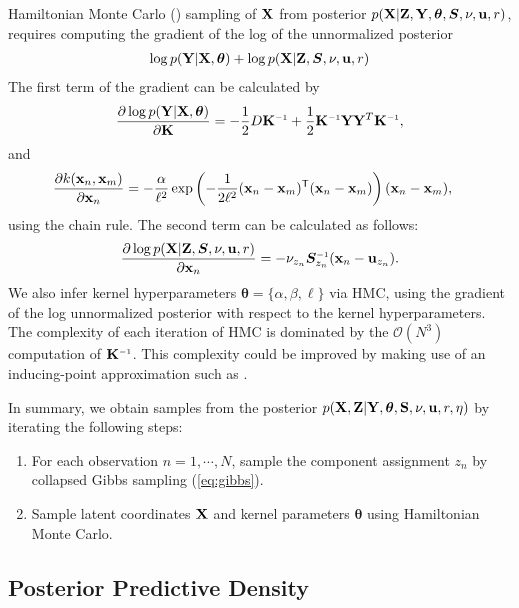 Hamiltonian Monte Carlo (\HMC{}) sampling of $\mathbf{X}$ from posterior ${p(\mathbf{X}|\mathbf{Z},\mathbf{Y},\bm{\theta},\bm{S},\nu,{\bf{u}},r)}$, requires computing the gradient of the log of the unnormalized posterior
%
\begin{align}
\log p(\mathbf{Y}|\mathbf{X},\bm{\theta}) + \log p(\mathbf{X}|\mathbf{Z},\bm{S},\nu,{\bf{u}},r)
\end{align}
%
The first term of the gradient can be calculated by
%
\begin{align}
\pderiv{\log p(\vY | \vX,\bm{\theta})}{\vK} = -\frac{1}{2}D\vK\inv+\frac{1}{2}\vK\inv \vY \vY^{T} \vK\inv, 
\end{align}
%
and
%
\begin{align}
\frac{\partial k({\bf{x}}_{n},{\bf{x}}_{m})}{\partial {\bf{x}}_n}
 & = -\frac{\alpha}{\ell^2} \exp \left( - \frac{1}{2 \ell^2} ({\bf{x}}_n - {\bf{x}}_m)^{\mathsf{T}} ({\bf{x}}_n - {\bf{x}}_m) \right) ({\bf{x}}_n - {\bf{x}}_m),
\end{align}
%
using the chain rule.
The second term can be calculated as follows:
\begin{align}
\frac{\partial \log p(\vX|\vZ,\bm{S},\nu,\vu,r)}{\partial \vx_{n}} 
= -\nu_{z_{n}}\bm{S}_{z_{n}}\inv(\vx_{n}-\vu_{z_{n}}).
\end{align}
We also infer kernel hyperparameters $\bm{\theta}=\{\alpha,\beta,\ell\}$ via HMC, using the gradient of the log unnormalized posterior with respect to the kernel hyperparameters.
The complexity of each iteration of HMC is dominated by the $\mathcal{O}(N^3)$ computation of $\vK\inv$.
This complexity could be improved by making use of an inducing-point approximation such as \citep{quinonero2005unifying,snelson2006sparse}.


In summary, we obtain samples from the posterior $p(\mathbf{X},\mathbf{Z}|\mathbf{Y},\bm{\theta},\mathbf{S},\nu,{\bf{u}},r,\eta)$ 
by iterating the following steps:
\begin{enumerate}
\item For each observation $n=1,\cdots,N$,
sample the component assignment $z_{n}$ by collapsed Gibbs sampling (\ref{eq:gibbs}).
\item Sample latent coordinates $\mathbf{X}$ and kernel parameters $\bm{\theta}$ using Hamiltonian Monte Carlo.
\end{enumerate}




\subsection{Posterior Predictive Density}

